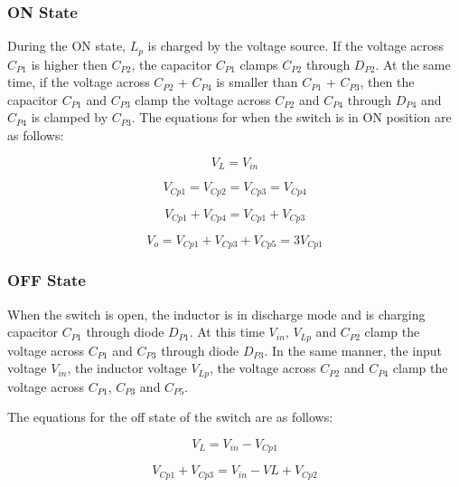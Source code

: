 \subsubsection{ON State}

During the ON state, $L_p$ is charged by the voltage source. If the voltage across $C_{P1}$ is higher then $C_{P2}$, the capacitor $C_{P1}$ clamps $C_{P2}$ through $D_{P2}$. At the same time, if the voltage across $C_{P2}$ + $C_{P4}$ is smaller than $C_{P1}$ + $C_{P3}$, then the capacitor $C_{P1}$ and $C_{P3}$ clamp the voltage across $C_{P2}$ and $C_{P4}$ through $D_{P4}$ and $C_{P4}$ is clamped by $C_{P3}$. The equations for when the switch is in ON position are as follows:

\begin{equation}
	V_L = V_{in} 
	\label{eq:MBC_ON1}
\end{equation} 

\begin{equation}
	V_{Cp1} = V_{Cp2} = V_{Cp3} = V_{Cp4}
	\label{eq:MBC_ON2}
\end{equation} 

\begin{equation}
	V_{Cp1} + V_{Cp4} = V_{Cp1} + V_{Cp3}
	\label{eq:MBC_ON3}
\end{equation} 

\begin{equation}
	V_o = V_{Cp1} + V_{Cp3} + V_{Cp5} = 3V_{Cp1}
	\label{eq:MBC_ON4}
\end{equation}

\subsubsection{OFF State}
When the switch is open, the inductor is in discharge mode and is charging capacitor $C_{P1}$ through diode $D_{P1}$. At this time $V_{in}$, $V_{Lp}$ and $C_{P2}$ clamp the voltage across $C_{P1}$ and $C_{P3}$ through diode $D_{P3}$. In the same manner, the input voltage $V_{in}$, the inductor voltage $V_{Lp}$, the voltage across $C_{P2}$ and $C_{P4}$ clamp the voltage across $C_{P1}$, $C_{P3}$ and $C_{P5}$.

The equations for the off state of the switch are as follows:

\begin{equation}
	V_L = V_{in} - V_{Cp1}
	\label{eq:MBC_OFF1}
\end{equation}

\begin{equation}
	V_{Cp1} + V_{Cp3} = V_{in} - V{L} + V_{Cp2}
	\label{eq:MBC_OFF2}
\end{equation}
 
